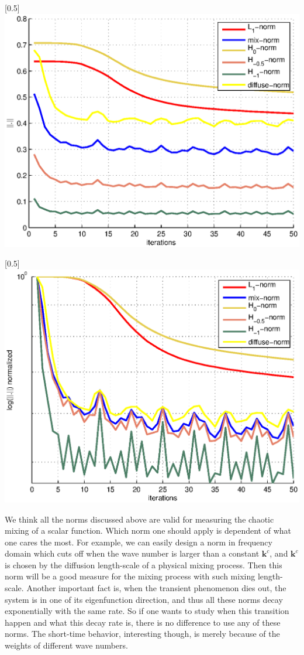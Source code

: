 \documentclass{article}
\begin{document}
\centerline{\scalebox{0.5}[0.5]{\includegraphics{normplot.eps} \label{normplot}}}
\centerline{\scalebox{0.5}[0.5]{\includegraphics{lognormplot.eps} \label{lognormplot}}}

We think all the norms discussed above are valid for measuring the
chaotic mixing of a scalar function. Which norm one should apply is
dependent of what one cares the most. For example, we can easily
design a norm in frequency domain which cuts off when the wave
number is larger than a constant $\mathbf{k}^c$, and $\mathbf{k}^c$
is chosen by the diffusion length-scale of a physical mixing
process. Then this norm will be a good measure for the mixing
process with such mixing length-scale. Another important fact is,
when the transient phenomenon dies out, the system is in one of its
eigenfunction direction, and thus all these norms decay
exponentially with the same rate. So if one wants to study when this
transition happen and what this decay rate is, there is no
difference to use any of these norms. The short-time behavior,
interesting though, is merely because of the weights of different
wave numbers.
\end{document}
